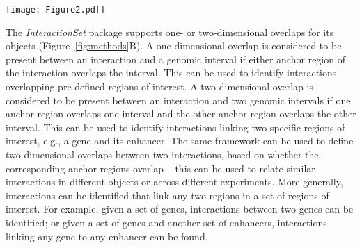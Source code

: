 \documentclass[10pt,a4paper,twocolumn]{article}
\begin{document}
\begin{figure*}
\centering
\texttt{[image: Figure2.pdf]}
\caption{Schematic of several methods in the \textit{InteractionSet} package.
(A) Minimum bounding boxes can be identified for groups of interactions using the  method.
Here, $u'$, $v'$ and $w'$ belong in one group while $x'$, $y'$ and $z'$ belong in another.
(B) One- or two-dimensional overlaps can be identified between interactions and one or two genomic intervals, respectively, using the  method.
Here, $x'$ and $y'$ have one-dimensional overlaps with the gene and enhancer, respectively, while $z'$ has a two-dimensional overlap with the gene \textit{and} the enhancer.
(C) An  object contains data -- in this case, read pair count data -- for interactions in the two-dimensional interaction space.
Given a bait region, a ``cross-section'' of the space can be extracted and converted into a  object using the  method.
This object holds count data for intervals on the linear genome (blue lines) where the count for each interval describes the strength of the interaction between that interval and the bait.
This format effectively mimics that of 4C data.
}
\label{fig:methods}
\end{figure*}

The \textit{InteractionSet} package supports one- or two-dimensional overlaps for its objects (Figure~\ref{fig:methods}B).
A one-dimensional overlap is considered to be present between an interaction and a genomic interval if either anchor region of the interaction overlaps the interval.
This can be used to identify interactions overlapping pre-defined regions of interest.
A two-dimensional overlap is considered to be present between an interaction and two genomic intervals if one anchor region overlaps one interval and the other anchor region overlaps the other interval.
This can be used to identify interactions linking two specific regions of interest, e.g., a gene and its enhancer.
The same framework can be used to define two-dimensional overlaps between two interactions, based on whether the corresponding anchor regions overlap -- this can be used to relate similar interactions in different  objects or across different experiments.
More generally, interactions can be identified that link any two regions in a set of regions of interest. 
For example, given a set of genes, interactions between two genes can be identified; or given a set of genes and another set of enhancers, interactions linking any gene to any enhancer can be found.
\end{document}
